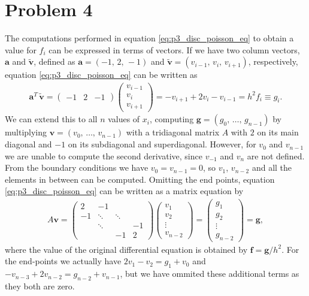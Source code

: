 \documentclass[english,notitlepage,nofootinbib]{revtex4-1}  %
\begin{document}
\section*{Problem 4}
The computations performed in equation \eqref{eq:p3_disc_poisson_eq} to obtain a value for $f_i$ can be expressed in terms of vectors. If we have two column vectors, $\mathbf{a}$ and $\mathbf{\tilde{v}}$, defined as $\mathbf{a}=(-1,\,2,\,-1)$ and $\mathbf{\tilde{v}}=(v_{i-1},\,v_i,\,v_{i+1})$, respectively, equation \eqref{eq:p3_disc_poisson_eq} can be written as  
\begin{align*}
    \mathbf{a}^T \, \mathbf{\tilde{v}} = \begin{pmatrix}
        -1 & 2 & -1 
    \end{pmatrix}
    \begin{pmatrix}
        v_{i-1} \\ 
        v_i \\ 
        v_{i+1}
    \end{pmatrix}
    = -v_{i+1}+2v_i-v_{i-1} = h^2 f_i \equiv g_i.
\end{align*}
We can extend this to all $n$ values of $x_i$, computing $\mathbf{g}=(g_0,\,\dots,\,g_{n-1})$ by multiplying $\mathbf{v}=(v_0,\,\dots,\,v_{n-1})$ with a tridiagonal matrix $A$ with $2$ on its main diagonal and $-1$ on its subdiagonal and superdiagonal. However, for $v_0$ and $v_{n-1}$ we are unable to compute the second derivative, since $v_{-1}$ and $v_{n}$ are not defined. From the boundary conditions we have $v_0=v_{n-1}=0$, so $v_1$, $v_{n-2}$ and all the elements in between can be computed. Omitting the end points, equation \eqref{eq:p3_disc_poisson_eq} can be written as a matrix equation by  
\begin{align} \label{eq:p4_matrix_eq}
    A\mathbf{v} = 
    \begin{pmatrix}
        2 & -1 & & \\
        -1 & \ddots & \ddots & \\ 
         & \ddots & & -1 \\
          & & -1 & 2
    \end{pmatrix}
    \begin{pmatrix}
        v_1 \\
        v_2 \\
        \vdots \\ 
        v_{n-2}
    \end{pmatrix} = 
    \begin{pmatrix}
        g_1 \\
        g_2 \\ 
        \vdots \\
        g_{n-2}
    \end{pmatrix}
    = \mathbf{g},
\end{align}
where the value of the original differential equation is obtained by $\mathbf{f}=\mathbf{g}/h^2$. For the end-points we actually have $2v_1-v_2=g_1+v_0$ and $-v_{n-3}+2v_{n-2}=g_{n-2}+v_{n-1}$, but we have ommited these additional terms as they both are zero. 
\end{document}
